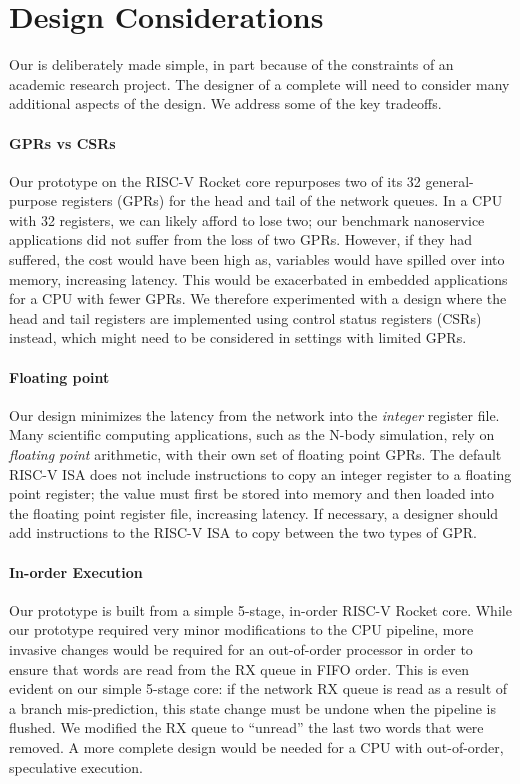 \section{Design Considerations}
Our \name{} is deliberately made simple, in part because of the constraints of an academic research project. The designer of a complete \name{} will need to consider many additional aspects of the design. We address some of the key tradeoffs. 

\paragraph{GPRs vs CSRs} Our \name{} prototype on the RISC-V Rocket core repurposes two of its 32 general-purpose registers (GPRs) for the head and tail of the network queues. In a CPU with 32 registers, we can likely afford to lose two; our benchmark nanoservice applications did not suffer from the loss of two GPRs. However, if they had suffered, the cost would have been high as, variables would have spilled over into memory, increasing latency. This would be exacerbated in embedded applications for a CPU with fewer GPRs. We therefore experimented with a design where the head and tail registers are implemented using control status registers (CSRs) instead, which might need to be considered in  settings with limited GPRs.

\paragraph{Floating point} Our \name{} design minimizes the latency from the network into the \emph{integer} register file.
Many scientific computing applications, such as the N-body simulation, rely on \emph{floating point} arithmetic, with their own set of floating point GPRs.
The default RISC-V ISA does not include instructions to copy an integer register to a floating point register; the value must first be stored into memory and then loaded into the floating point register file, increasing latency. If necessary, a designer should add instructions to the RISC-V ISA to copy between the two types of GPR. 

\paragraph{In-order Execution} Our \name{} prototype is built from a simple 5-stage, in-order RISC-V Rocket core.  While our prototype required very minor modifications to the CPU pipeline, more invasive changes would be required for an out-of-order processor in order to ensure that words are read from the RX queue in FIFO order. This is even evident on our simple 5-stage core: if the network RX queue is read as a result of a branch mis-prediction, this state change must be undone when the pipeline is flushed. We modified the RX queue to ``unread'' the last two words that were removed. A more complete design would be needed for a CPU with out-of-order, speculative execution.

